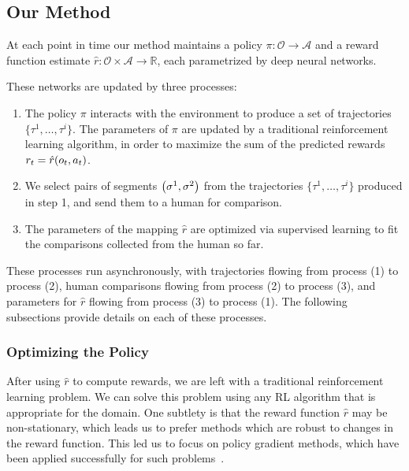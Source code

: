 \documentclass{article}
\def\O{\mathcal{O}} %
\def\A{\mathcal{A}} %
\def\rest{\hat{r}}  %
\DeclarePairedDelimiter{\pdelims}{(}{)}
\newcommand{\of}[1]{\pdelims*{#1}}
\begin{document}
\subsection{Our Method}

At each point in time our method maintains a policy $\pi : \O \rightarrow \A$
and a reward function estimate $\rest : \O \times \A \rightarrow \mathbb{R}$,
each parametrized by deep neural networks.

These networks are updated by three processes:

\begin{enumerate}
\item The policy $\pi$ interacts with the environment to produce a set of trajectories $\{ \tau^1, \ldots, \tau^i \}$.
    The parameters of $\pi$ are updated by a traditional reinforcement learning algorithm,
    in order to maximize the sum of the predicted rewards $r_t = \rest\of{o_t, a_t}$.
\item We select pairs of segments $\of{\sigma^1, \sigma^2}$
    from the trajectories $\{ \tau^1, \ldots, \tau^i \}$ produced in step 1,
    and send them to a human for comparison.
\item The parameters of the mapping $\rest$ are optimized via supervised learning to fit the comparisons collected from the human so far.
\end{enumerate}

These processes run asynchronously,
with trajectories flowing from process (1) to process (2),
human comparisons flowing from process (2) to process (3),
and parameters for $\rest$ flowing from process (3) to process (1).
The following subsections provide details on each of these processes.


\subsubsection{Optimizing the Policy}
\label{sssec:optimizing-the-policy}

After using $\rest$ to compute rewards, we are left with a traditional reinforcement learning problem.
We can solve this problem using any RL algorithm that is appropriate for the domain.
One subtlety is that the reward function $\rest$ may be non-stationary, which leads us to prefer methods
which are robust to changes in the reward function. 
This led us to focus on policy gradient methods,
which have been applied successfully for such problems~\citep{Ho16}.
\end{document}
